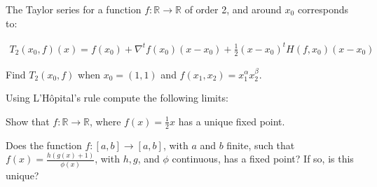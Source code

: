 \documentclass[noanswers]{exam}
\begin{document}
\begin{questions}

\question The Taylor series for a function $f:\mathbb{R}\rightarrow\mathbb{R}$ of order 2, and around $x_0$ corresponds to:

\begin{align*}
    T_2(x_0,f)(x)=f(x_0)+\nabla^t f(x_0)(x-x_0)+\frac{1}{2}(x-x_0)^tH(f,x_0)(x-x_0)
\end{align*}

Find $T_2(x_0,f)$ when $x_0=(1,1)$ and $f(x_1,x_2)=x_1^\alpha x_2^\beta$.

\question Using L'H\^ opital's rule compute the following limits:


\question Show that $f:\mathbb{R}\rightarrow\mathbb{R}$, where $f(x)=\frac{1}{2}x$ has a unique fixed point.

\question Does the function $f:[a,b]\rightarrow[a,b]$, with $a$ and $b$ finite, such that $f(x)=\frac{h(g(x)+1)}{\phi(x)}$, with $h,g$, and $\phi$ continuous, has a fixed point? If so, is this unique?

\end{questions}
\end{document}

